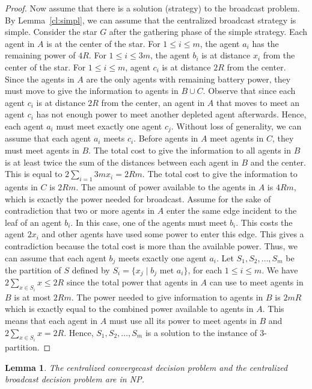 \documentclass{article}
\newtheorem{lemma}{Lemma}
\newcommand\strat{\mbox{strategy}\xspace}
\newcommand\cccast{centralized convergecast\xspace}
\begin{document}
\begin{proof}
\medskip

Now assume that there is a solution (strategy) to the broadcast problem.
By Lemma~\ref{cl:simpl}, we can assume that the centralized broadcast {\strat} is simple. Consider the star $G$ after the gathering phase of the simple {\strat}. Each agent in $A$ is at the center of the star. For $1\leq i\leq m$, the agent $a_i$ has the remaining power of $4R$. For $1\leq i\leq 3m$, the agent $b_i$ is at distance $x_i$ from the center of the star. For $1\leq i\leq m$, agent $c_i$ is at distance $2R$ from the center. Since the agents in $A$ are the only agents with remaining battery power, they must move to give the information to agents in $B\cup C$. Observe that since each agent $c_i$ is at distance $2R$ from the center, an agent in $A$ that moves to meet an agent $c_i$ has not enough power to meet another depleted 
agent afterwards. Hence, each agent $a_i$ must meet exactly one agent $c_j$. Without loss of generality, we can assume that each agent $a_i$ meets $c_i$. Before agents in $A$ meet agents in $C$, they must meet agents in $B$. The total cost to give the information to all agents in $B$ is at least twice the sum of the distances between each agent in $B$ and the center. This is equal to $2\sum_{i=1}{3m}x_i=2Rm$. The total cost to give the information to agents in $C$ is 
$2Rm$. The amount of power available to the agents in $A$ is $4Rm$, which is exactly the power needed for broadcast.
Assume for the sake of contradiction that two or more agents in $A$ enter the same edge incident to the leaf of an agent $b_i$. In this case, one of the agents must meet $b_i$. This costs the agent $2x_i$ and other agents have used some power to enter this edge. This gives a contradiction because the total cost is more than the available power. Thus, we can assume that each agent $b_j$ meets exactly one agent $a_i$. Let $S_1,S_2, \dots, S_m$ be the partition of $S$ defined by $S_i=\{x_j\mid \mbox{$b_j$ met $a_i$}\}$, for each $1\leq i\leq m$. We have $2\sum_{x\in S_i}x\leq 2R$ since the total power that agents  in $A$ can use to meet agents in $B$ is at most $2Rm$. The power needed to give information to agents in $B$ is $2mR$ which is exactly equal to the combined power available to agents in $A$. This means that each agent in $A$ must use all its power to meet agents in $B$ and $2\sum_{x\in S_i}x=2R$. Hence, $S_1,S_2, \dots, S_m$ is a solution to the instance of 3-partition.
\end{proof}

\begin{lemma}\label{lem:NP-graph}
The {\cccast} decision problem and the centralized broadcast decision problem are in NP.  
\end{lemma}
\end{document}
